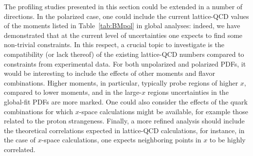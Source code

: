 The profiling studies presented in this section could be extended in
a number of directions.
%
In the polarized case, one could include the current lattice-QCD
values of the moments listed in Table~\ref{tab:BMpol} in global analyses: 
indeed, we have demonstrated that at the current level of uncertainties one 
expects to find some non-trivial constraints.
%
In this respect, a crucial topic to investigate is the compatibility 
(or lack thereof) of the existing lattice-QCD numbers compared to constraints 
from experimental data.
%
For both unpolarized and polarized PDFs, it would be interesting to include the 
effects of other moments and flavor combinations.
%
Higher moments, in particular, typically probe regions of higher $x$, compared
to lower moments, and in the large-$x$ regions uncertainties in the global-fit 
PDFs are more marked.
%
One could also consider the effects of the quark combinations for which 
$x$-space calculations might be available, for example those related to the 
proton strangeness.
%
Finally, a more refined analysis should include the theoretical correlations
expected in lattice-QCD calculations, for instance, in the case of $x$-space 
calculations, one expects neighboring points in $x$ to be highly correlated.

